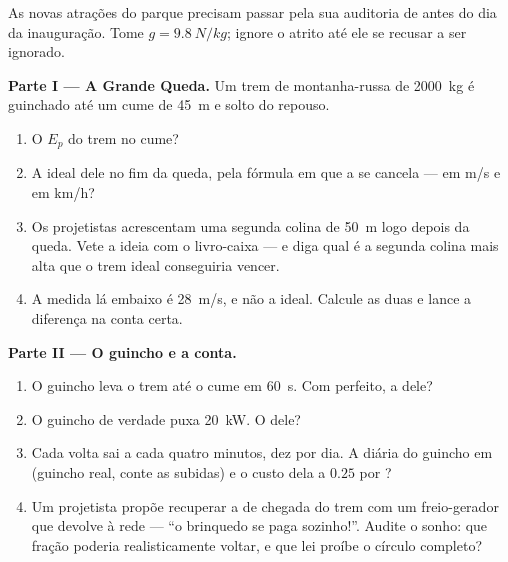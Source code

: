 \begin{problem}\label{pb:g9:energy-conversions:1}
As novas atrações do parque precisam passar pela sua auditoria de
 antes do dia da inauguração. Tome $g = \qty{9.8}{N/kg}$;
ignore o atrito até ele se recusar a ser ignorado.

\medskip\noindent\textbf{Parte I --- A Grande Queda.}
Um trem de montanha-russa de \qty{2000}{kg} é guinchado até um cume
de \qty{45}{m} e solto do repouso.
\begin{enumerate}
  \item O $E_p$ do trem no cume?
  \item A  ideal dele no fim da queda, pela fórmula em que
        a  se cancela --- em \unit{m/s} e em \unit{km/h}?
  \item Os projetistas acrescentam uma segunda colina de \qty{50}{m}
        logo depois da queda. Vete a ideia com o livro-caixa --- e
        diga qual é a segunda colina mais alta que o trem ideal
        conseguiria vencer.
  \item A  medida lá embaixo é \qty{28}{m/s}, e não a
        ideal. Calcule as duas  e lance a diferença
        na conta certa.
\end{enumerate}

\medskip\noindent\textbf{Parte II --- O guincho e a conta.}
\begin{enumerate}[resume]
  \item O guincho leva o trem até o cume em \qty{60}{s}. Com
         perfeito, a  dele?
  \item O guincho de verdade puxa \qty{20}{kW}. O  dele?
  \item Cada volta sai a cada quatro minutos, dez  por dia. A
         diária do guincho em  (guincho real,
        conte as subidas) e o custo dela a $0.25$ por ?
  \item Um projetista propõe recuperar a  de chegada do trem
        com um freio-gerador que devolve à rede --- ``o brinquedo se
        paga sozinho!''. Audite o sonho: que fração poderia
        realisticamente voltar, e que lei proíbe o círculo completo?
\end{enumerate}


\end{problem}
